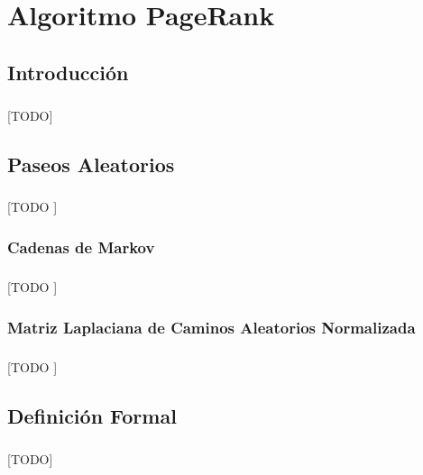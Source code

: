 \documentclass{subfiles}
\begin{document}
  \chapter{Algoritmo PageRank}
  \label{chap:graphs}

    \section{Introducción}
    \label{sec:pagerank_intro}

      \paragraph{}
      [TODO]

    \section{Paseos Aleatorios}
    \label{sec:random_walks}

      \paragraph{}
      [TODO ]

      \subsection{Cadenas de Markov}
      \label{sec:markov_chains}

        \paragraph{}
        [TODO ]

      \subsection{Matriz Laplaciana de Caminos Aleatorios Normalizada}
      \label{sec:random_walk_normalized_laplacian_matrix}

        \paragraph{}
        [TODO ]

    \section{Definición Formal}
    \label{sec:pagerank_formal_definition}

      \paragraph{}
      [TODO]
\end{document}
